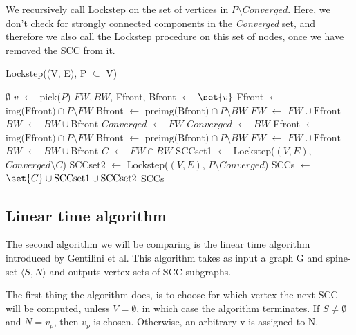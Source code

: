\documentclass[../master/master.tex]{subfiles}
\newcommand*\Let[2]{\State #1 $\gets$ #2}
\begin{document}
We recursively call Lockstep on the set of vertices in $P\setminus Converged$. Here, we don't check for strongly connected components in the \emph{Converged} set, and therefore we also call the Lockstep procedure on this set of nodes, once we have removed the SCC from it.
\begin{algorithm}
  \caption{Lockstep((V, E), P $\subseteq$ V)}
  \begin{algorithmic}[1]
    \Statex
     \State \Return $\emptyset$
    \EndIf
    \Statex
    \Let{$v$}{pick($P$)}
    \Let{$FW, BW$, Ffront, Bfront}{$\set{v}$}
    \Statex
     \Let{Ffront}{$\text{img(Ffront)}\cap P\setminus FW$}
     \Let{Bfront}{$\text{preimg(Bfront)}\cap P\setminus BW$}
     \Let{$FW$}{$FW\cup\text{Ffront}$}
     \Let{$BW$}{$BW\cup\text{Bfront}$}
    \EndWhile
    \Statex
     \Let{$Converged$}{$FW$}
    \Else
     \Let{$Converged$}{$BW$}
    \EndIf
    \Statex
     \Let{Ffront}{$\text{img(Ffront)}\cap P\setminus FW$}
     \Let{Bfront}{$\text{preimg(Bfront)}\cap P\setminus BW$}
     \Let{$FW$}{$FW\cup\text{Ffront}$}
     \Let{$BW$}{$BW\cup\text{Bfront}$}
    \EndWhile
    \Statex
    \Let{$C$}{$FW\cap BW$}
    \Let{SCCset1}{Lockstep($(V, E)$, $Converged\setminus C$)}
    \Let{SCCset2}{Lockstep($(V, E)$, $P\setminus Converged$)}
    \Let{SCCs}{$\set{C}\cup \text{SCCset1} \cup \text{SCCset2}$}
    \State \Return SCCs
  \end{algorithmic}
\end{algorithm}

\subsection{Linear time algorithm}
The second algorithm we will be comparing is the linear time algorithm \cite{linear} introduced by Gentilini et al. This algorithm takes as input a graph G and spine-set $\langle S, N\rangle$ and outputs vertex sets of SCC subgraphs.

The first thing the algorithm does, is to choose for which vertex the next SCC will be computed, unless $V=\emptyset
$, in which case the algorithm terminates. If $S\neq\emptyset$ and $N={v_p}$, then $v_p$ is chosen. Otherwise, an arbitrary v is assigned to N.
\end{document}

